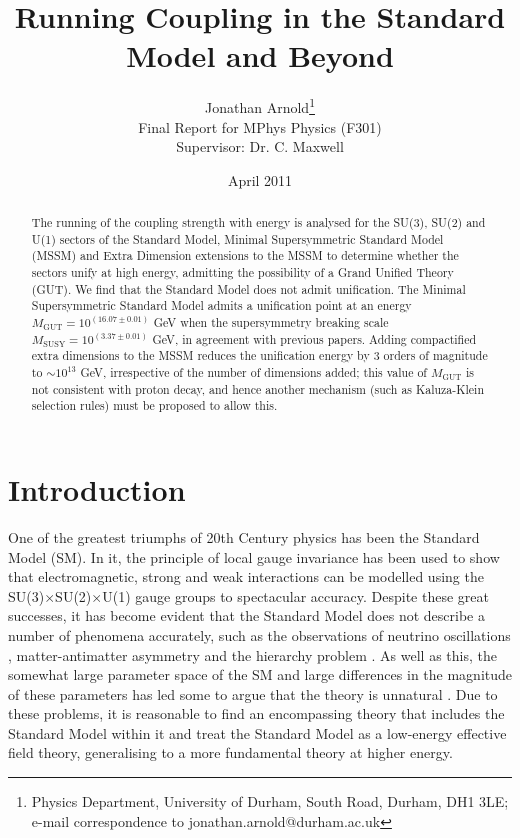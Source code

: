 \documentclass[12pt,a4paper,oneside]{article}
\begin{document}
\title{Running Coupling in the Standard Model and Beyond} 
\date{April 2011}
\author{Jonathan Arnold\thanks{Physics Department, University of Durham, South Road, Durham, DH1 3LE; e-mail correspondence to jonathan.arnold@durham.ac.uk} \\ Final Report for MPhys Physics (F301) \\ Supervisor: Dr. C. Maxwell}

\maketitle

\doublespace

\begin{abstract}
The running of the coupling strength with energy is analysed for the SU(3), SU(2) and U(1) sectors of the Standard Model, Minimal Supersymmetric Standard Model (MSSM) and Extra Dimension extensions to the MSSM to determine whether the sectors unify at high energy, admitting the possibility of a Grand Unified Theory (GUT). We find that the Standard Model does not admit unification. The Minimal Supersymmetric Standard Model admits a unification point at an energy $M_\mathrm{GUT} = 10^{(16.07 \pm 0.01)}$ GeV when the supersymmetry breaking scale $M_\mathrm{SUSY} = 10^{(3.37 \pm 0.01)}$ GeV, in agreement with previous papers. Adding compactified extra dimensions to the MSSM reduces the unification energy by 3 orders of magnitude to $\sim 10^{13}$ GeV, irrespective of the number of dimensions added; this value of $M_\mathrm{GUT}$ is not consistent with proton decay, and hence another mechanism (such as Kaluza-Klein selection rules) must be proposed to allow this.
\end{abstract}

\newpage
\tableofcontents

\newpage
\section{Introduction}

One of the greatest triumphs of 20th Century physics has been the Standard Model (SM). In it, the principle of local gauge invariance has been used to show that electromagnetic, strong and weak interactions can be modelled using the SU(3)$\times$SU(2)$\times$U(1) gauge groups to spectacular accuracy\cite{sm-1,sm-2}. Despite these great successes, it has become evident that the Standard Model does not describe a number of phenomena accurately, such as the observations of neutrino oscillations \cite{neutrinos}, matter-antimatter asymmetry \cite{mass} and the hierarchy problem \cite{hier}. As well as this, the somewhat large parameter space of the SM and large differences in the magnitude of these parameters has led some to argue that the theory is unnatural \cite{unnatural}. Due to these problems, it is reasonable to find an encompassing theory that includes the Standard Model within it and treat the Standard Model as a low-energy effective field theory, generalising to a more fundamental theory at higher energy.
\end{document}
